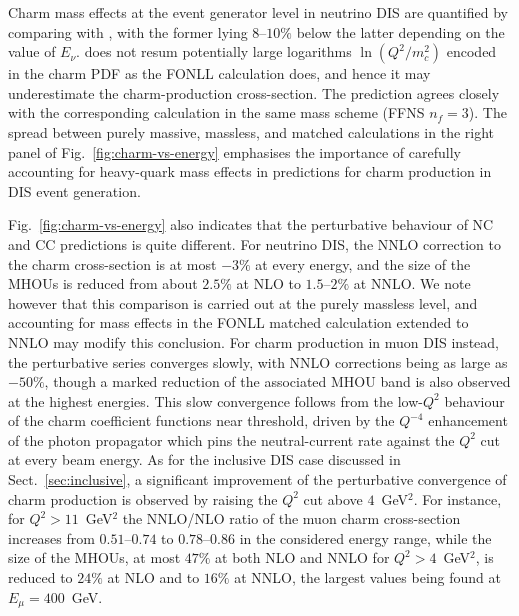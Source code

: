 Charm mass effects at the event generator level in neutrino DIS are quantified by comparing \powhegtwomc with \powhegtwo, with the former lying $8$--$10\%$ below the latter depending on the value of $E_\nu$.
%
\powhegtwomc does not resum potentially large logarithms $\ln(Q^2/m_c^2)$ encoded in the charm PDF as the FONLL calculation does, and hence it may underestimate the charm-production cross-section.
%
The \powhegtwomc prediction agrees closely with the corresponding \yadism calculation in the same mass scheme (FFNS $n_f=3$).
%
The spread between purely massive, massless, and matched calculations in the right panel of Fig.~\ref{fig:charm-vs-energy} emphasises the importance of carefully accounting for heavy-quark mass effects in predictions for charm production in DIS event generation.  

Fig.~\ref{fig:charm-vs-energy} also indicates that the perturbative behaviour of NC and CC predictions is quite different.
%
For neutrino DIS, the NNLO correction to the charm cross-section is at most $-3\%$ at every energy, and the size of the MHOUs is reduced from about $2.5\%$ at NLO to $1.5$--$2\%$ at NNLO.
%
We note however that this comparison is carried out at the purely massless level, and accounting for mass effects in the FONLL matched calculation extended to NNLO may modify this conclusion.
%
For charm production in muon DIS instead, the perturbative series converges slowly, with NNLO corrections being as large as $-50\%$, though a marked reduction of the associated MHOU band is also observed at the highest energies. 
%
This slow convergence follows from the low-$Q^2$ behaviour of the charm coefficient functions near threshold, driven by the $Q^{-4}$ enhancement of the photon propagator which pins the neutral-current rate against the $Q^2$ cut at every beam energy.
%
As for the inclusive DIS case discussed in Sect.~\ref{sec:inclusive}, a significant improvement of the perturbative convergence of charm production is observed by raising the $Q^2$ cut above $4$~GeV$^2$.
%
For instance, for $Q^2>11$~GeV$^2$ the NNLO/NLO ratio of the muon charm cross-section increases from $0.51$--$0.74$ to $0.78$--$0.86$ in the considered energy range, while the size of the MHOUs, at most $47\%$ at both NLO and NNLO for $Q^2>4$~GeV$^2$, is reduced to $24\%$ at NLO and to $16\%$ at NNLO, the largest values being found at $E_\mu=400$~GeV.

